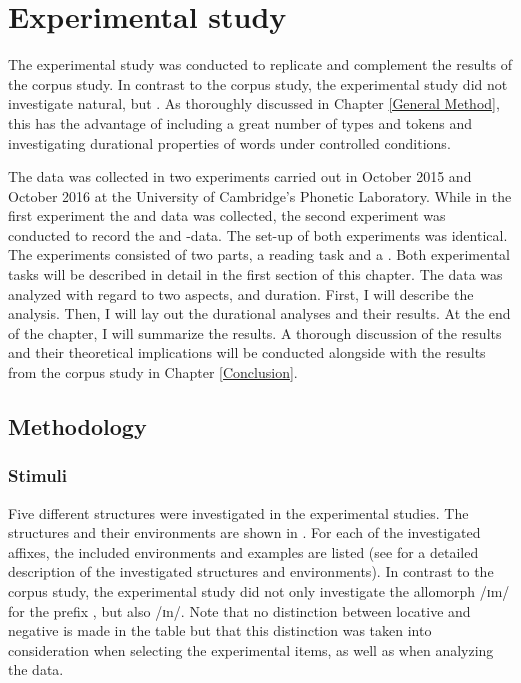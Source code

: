 \chapter{Experimental study} \label{Experimental Studies}


The experimental study was conducted to replicate and complement the results of the corpus study. In contrast to the corpus study, the experimental study did not investigate natural,  but . As thoroughly discussed in Chapter \ref{General Method}, this has the advantage of including a great number of types and tokens and investigating durational properties of words under controlled conditions.

 The data was collected in two experiments carried out in October 2015 and October 2016 at the University of Cambridge's Phonetic Laboratory. While in the first experiment the  and data was collected, the second experiment was conducted to record the  and -data. 
  The set-up of both experiments was identical. The experiments consisted of two parts, a reading task and a . 
 Both experimental tasks will be described in detail in the first section of this chapter.
 The data was analyzed with regard to two aspects,  and duration. First, I will describe the  analysis.  Then, I will lay out the durational analyses and their results. At the end of the chapter, I will summarize the results. A thorough discussion of the results and their theoretical implications will be conducted alongside with the results from the corpus study in Chapter \ref{Conclusion}.



\section{Methodology}


\subsection{Stimuli} \label{stimuli experiment}

 Five different structures were investigated in the experimental studies. The structures and their environments are shown in . For each of the investigated affixes, the included environments and examples are listed (see  for a detailed description of the investigated structures and environments). In contrast to the corpus study, the experimental study did not only investigate the allomorph /ɪm/ for the prefix , but also /ɪn/. Note that no distinction between locative and negative  is made in the table but that this distinction was taken into consideration when selecting the experimental items, as well as when analyzing the data.




